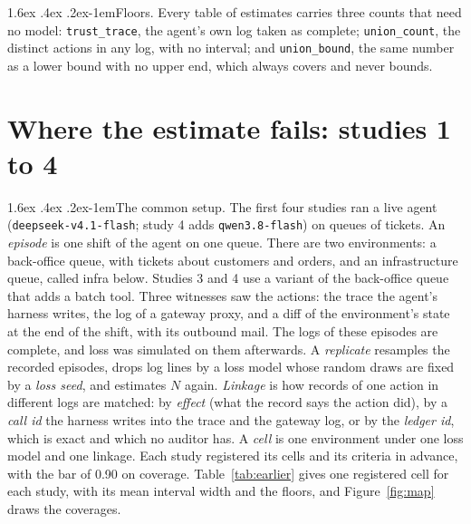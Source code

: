 \documentclass[11pt]{article}
\makeatletter
\renewcommand\paragraph{\@startsection{paragraph}{4}{\z@}%
  {1.6ex \@plus .4ex \@minus .2ex}{-1em}{\normalfont\normalsize\bfseries}}
\makeatother
\begin{document}
\paragraph{Floors.} Every table of estimates carries three counts that need no model:
\texttt{trust\_trace}, the agent's own log taken as complete; \texttt{union\_count}, the
distinct actions in any log, with no interval; and \texttt{union\_bound}, the same
number as a lower bound with no upper end, which always covers and never bounds.

\section{Where the estimate fails: studies 1 to 4}
\label{sec:earlier}

\paragraph{The common setup.} The first four studies ran a live agent
(\texttt{deepseek-v4.1-flash}; study 4 adds \texttt{qwen3.8-flash}) on queues of
tickets. An \emph{episode} is one shift of the agent on one queue. There are two
environments: a back-office queue, with tickets about customers and orders, and an
infrastructure queue, called infra below. Studies 3 and 4 use a variant of the
back-office queue that adds a batch tool. Three witnesses saw the actions: the trace the
agent's harness writes, the log of a gateway proxy, and a
diff of the environment's state at the end of the shift, with its outbound mail. The
logs of these episodes are complete, and loss was simulated on them afterwards. A
\emph{replicate} resamples the recorded episodes, drops log lines by a loss model whose
random draws are fixed by a \emph{loss seed}, and estimates $N$ again. \emph{Linkage} is
how records of one action in different logs are matched: by \emph{effect} (what the
record says the action did), by a \emph{call id} the harness writes into the trace and
the gateway log, or by the \emph{ledger id}, which is exact and which no auditor has.
A \emph{cell} is one environment under one loss model and one linkage. Each study
registered its cells and its criteria in advance, with the bar of 0.90 on coverage.
Table~\ref{tab:earlier} gives one registered cell for each study, with its mean
interval width and the floors, and Figure~\ref{fig:map} draws the coverages.

\begin{table}[!tb]
\centering\small

\caption{Studies 1 to 4 and the post hoc loss cells: coverage of \texttt{ll\_bic}, of a
tail-corrected sequence counter where it was computed, and of the three floors.}
\label{tab:earlier}
\end{table}
\end{document}
